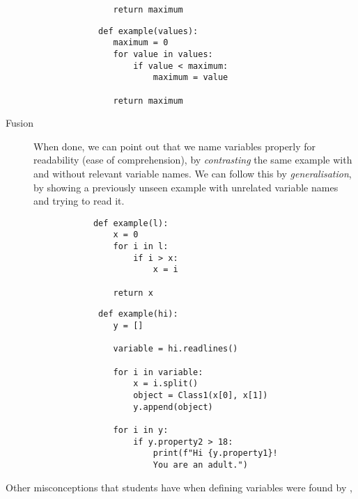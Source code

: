 \begin{description}
\begin{minipage}[t]{0.45\columnwidth}
\begin{verbatim}
                return maximum
        \end{verbatim}
    \end{minipage}
\hfill
    \begin{minipage}[t]{0.45\columnwidth}
        \begin{verbatim}
             def example(values):
                maximum = 0
                for value in values:
                    if value < maximum:
                        maximum = value
    
                return maximum
      \end{verbatim}
    \end{minipage}
\newline
    \item [Fusion] When done, we can point out that we name variables 
properly for readability (ease of comprehension), by \emph{contrasting}
 the same example with and without relevant variable names. We can 
follow this by \emph{generalisation}, by showing a previously unseen 
example with unrelated variable names and trying to read it.
    
    \hfill
     \begin{minipage}[t]{0.45\columnwidth}
        \begin{verbatim}
            def example(l):
                x = 0
                for i in l:
                    if i > x:
                        x = i
    
                return x
        \end{verbatim}
    \end{minipage}
\hfill
    \begin{minipage}[t]{0.45\columnwidth}
        \begin{verbatim}
             def example(hi):
                y = []
                
                variable = hi.readlines()
    
                for i in variable:
                    x = i.split()
                    object = Class1(x[0], x[1])
                    y.append(object)
                    
                for i in y:
                    if y.property2 > 18:
                        print(f"Hi {y.property1}! 
                        You are an adult.")
        \end{verbatim}
    \end{minipage}
\hfill
    
\end{description}
\vspace{5pt}
Other misconceptions that students have when defining variables were found 
by \textcite{GuoMarkelZhang2020},

